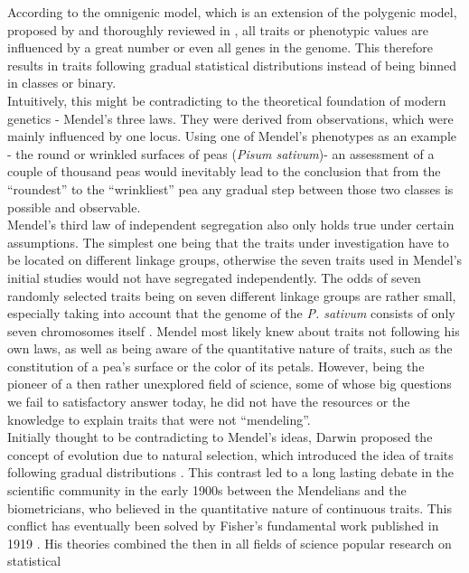 According to the omnigenic model, which is an extension of the polygenic model, proposed
by \cite{boyle2017expanded} and thoroughly reviewed in \cite{timpson2018}, all traits or
phenotypic values are influenced by a great number or even all genes in the genome. This
therefore results in traits following gradual statistical distributions instead of being
binned in classes or
binary.\\
Intuitively, this might be contradicting to the theoretical foundation of modern genetics
- Mendel's three laws. They were derived from observations, which were mainly influenced
by one locus. Using one of Mendel's phenotypes as an example - the round or wrinkled
surfaces of peas (\textit{Pisum sativum})- an assessment of a couple of thousand peas
would inevitably lead to the conclusion that from the ``roundest'' to the ``wrinkliest''
pea any gradual step between those two classes is
possible and observable. \\
Mendel's third law of independent segregation also only holds true under certain
assumptions. The simplest one being that the traits under investigation have to be located
on different linkage groups, otherwise the seven traits used in Mendel's initial studies
would not have segregated independently. The odds of seven randomly selected traits being
on seven different linkage groups are rather small, especially taking into account that
the genome of the \textit{P. sativum} consists of only seven chromosomes itself
\cite{kalo2004}. Mendel most likely knew about traits not following his own laws, as well
as being aware of the quantitative nature of traits, such as the constitution of a pea's
surface or the color of its petals. However, being the pioneer of a then rather unexplored
field of science, some of whose big questions we fail to satisfactory answer today, he did
not have
the resources or the knowledge to explain traits that were not ``mendeling''. \\
Initially thought to be contradicting to Mendel's ideas, Darwin proposed the concept of
evolution due to natural selection, which introduced the idea of traits following gradual
distributions \cite{darwin1859}. This contrast led to a long lasting debate in the
scientific community in the early 1900s between the Mendelians and the biometricians, who
believed in the quantitative nature of continuous traits. This conflict has eventually
been solved by Fisher's fundamental work published in 1919 \cite{fisher1919xv}. His
theories combined the then in all fields of science popular research on statistical
